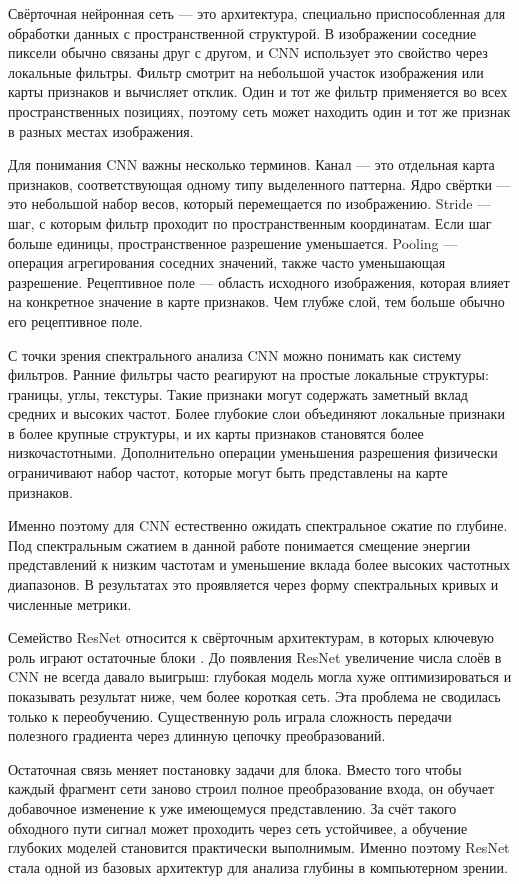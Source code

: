 Свёрточная нейронная сеть — это архитектура, специально приспособленная для обработки данных с пространственной структурой. В изображении соседние пиксели обычно связаны друг с другом, и CNN использует это свойство через локальные фильтры. Фильтр смотрит на небольшой участок изображения или карты признаков и вычисляет отклик. Один и тот же фильтр применяется во всех пространственных позициях, поэтому сеть может находить один и тот же признак в разных местах изображения.

Для понимания CNN важны несколько терминов. Канал — это отдельная карта признаков, соответствующая одному типу выделенного паттерна. Ядро свёртки — это небольшой набор весов, который перемещается по изображению. Stride — шаг, с которым фильтр проходит по пространственным координатам. Если шаг больше единицы, пространственное разрешение уменьшается. Pooling — операция агрегирования соседних значений, также часто уменьшающая разрешение. Рецептивное поле — область исходного изображения, которая влияет на конкретное значение в карте признаков. Чем глубже слой, тем больше обычно его рецептивное поле.

С точки зрения спектрального анализа CNN можно понимать как систему фильтров. Ранние фильтры часто реагируют на простые локальные структуры: границы, углы, текстуры. Такие признаки могут содержать заметный вклад средних и высоких частот. Более глубокие слои объединяют локальные признаки в более крупные структуры, и их карты признаков становятся более низкочастотными. Дополнительно операции уменьшения разрешения физически ограничивают набор частот, которые могут быть представлены на карте признаков.

Именно поэтому для CNN естественно ожидать спектральное сжатие по глубине. Под спектральным сжатием в данной работе понимается смещение энергии представлений к низким частотам и уменьшение вклада более высоких частотных диапазонов. В результатах это проявляется через форму спектральных кривых и численные метрики.

Семейство ResNet относится к свёрточным архитектурам, в которых ключевую роль играют остаточные блоки \cite{he2016deep}. До появления ResNet увеличение числа слоёв в CNN не всегда давало выигрыш: глубокая модель могла хуже оптимизироваться и показывать результат ниже, чем более короткая сеть. Эта проблема не сводилась только к переобучению. Существенную роль играла сложность передачи полезного градиента через длинную цепочку преобразований.

Остаточная связь меняет постановку задачи для блока. Вместо того чтобы каждый фрагмент сети заново строил полное преобразование входа, он обучает добавочное изменение к уже имеющемуся представлению. За счёт такого обходного пути сигнал может проходить через сеть устойчивее, а обучение глубоких моделей становится практически выполнимым. Именно поэтому ResNet стала одной из базовых архитектур для анализа глубины в компьютерном зрении.

